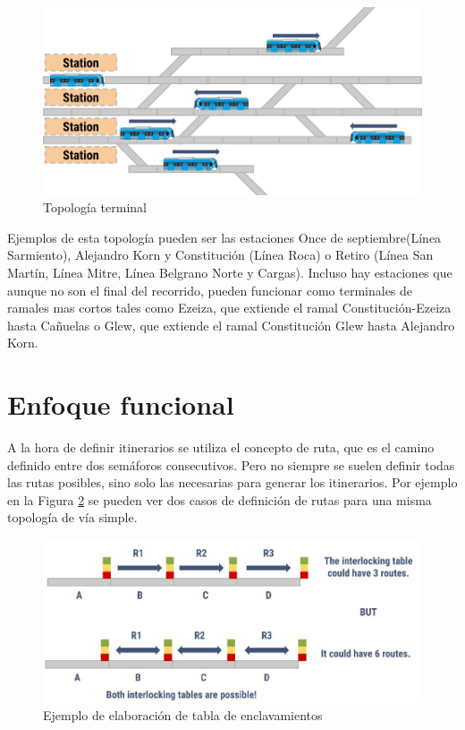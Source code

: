 			\begin{figure}[h]
			\centering
				\includegraphics[scale=.4]{./Figures/Terminal}
				\caption{Topología terminal}
				\label{fig:Terminal}
			\end{figure}
		
		Ejemplos de esta topología pueden ser las estaciones Once de septiembre(Línea Sarmiento), Alejandro Korn y Constitución (Línea Roca) o Retiro (Línea San Martín, Línea Mitre, Línea Belgrano Norte y Cargas). Incluso hay estaciones que aunque no son el final del recorrido, pueden funcionar como terminales de ramales mas cortos tales como Ezeiza, que extiende el ramal Constitución-Ezeiza hasta Cañuelas o Glew, que extiende el ramal Constitución Glew hasta Alejandro Korn.
							
\section{Enfoque funcional}
	\label{Incompletitud}
	
	A la hora de definir itinerarios se utiliza el concepto de ruta, que es el camino definido entre dos semáforos consecutivos. Pero no siempre se suelen definir todas las rutas posibles, sino solo las necesarias para generar los itinerarios. Por ejemplo en la Figura \ref{fig:EJ_Tabla} se pueden ver dos casos de definición de rutas para una misma topología de vía simple.
	
	\begin{figure}[h]
		\centering
			\includegraphics[scale=.4]{./Figures/Tablas}
			\caption{Ejemplo de elaboración de tabla de enclavamientos}
			\label{fig:EJ_Tabla}
		\end{figure}
	
